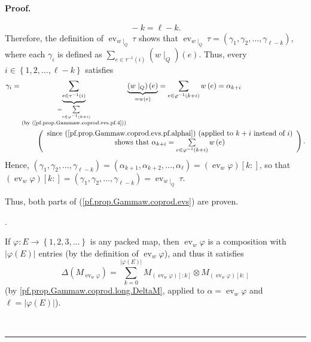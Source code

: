 \documentclass[numbers=enddot,12pt,final,onecolumn,notitlepage,abstracton]{scrartcl}
\theoremstyle{definition}
\newenvironment{proof}[1][Proof]{\noindent\textbf{#1.} }{\ \rule{0.5em}{0.5em}}
\let\sumnonlimits\sum
\renewcommand{\sum}{\sumnonlimits\limits}
\newenvironment{verlong}{}{}
\newcommand{\ev}{\operatorname{ev}}
\begin{document}
\begin{verlong}
\begin{proof}
{\begin{align*}
{}-k=\ell-k.
\end{align*}
Therefore, the definition of $\operatorname{ev}_{w\mid_{Q}}\tau$ shows that
$\operatorname{ev}_{w\mid_{Q}}\tau=\left(  \gamma_{1},\gamma_{2},\ldots
,\gamma_{\ell-k}\right)  $, where each $\gamma_{i}$ is defined as $\sum
_{e\in\tau^{-1}\left(  i\right)  }\left(  w\mid_{Q}\right)  \left(  e\right)
$. Thus, every $i\in\left\{  1,2,\ldots,\ell-k\right\}  $ satisfies%
\begin{align*}
\gamma_{i}  &  =\underbrace{\sum_{e\in\tau^{-1}\left(  i\right)  }%
}_{\substack{=\sum_{e\in\varphi^{-1}\left(  k+i\right)  }\\\text{(by
(\ref{pf.prop.Gammaw.coprod.evs.pf.4}))}}}\underbrace{\left(  w\mid
_{Q}\right)  \left(  e\right)  }_{=w\left(  e\right)  }=\sum_{e\in\varphi
^{-1}\left(  k+i\right)  }w\left(  e\right)  =\alpha_{k+i}\\
&  \ \ \ \ \ \ \ \ \ \ \left(
\begin{array}
[c]{c}%
\text{since (\ref{pf.prop.Gammaw.coprod.evs.pf.alphai}) (applied to }k+i\text{
instead of }i\text{)}\\
\text{shows that }\alpha_{k+i}=\sum_{e\in\varphi^{-1}\left(  k+i\right)
}w\left(  e\right)
\end{array}
\right)  .
\end{align*}
Hence, $\left(  \gamma_{1},\gamma_{2},\ldots,\gamma_{\ell-k}\right)  =\left(
\alpha_{k+1},\alpha_{k+2},\ldots,\alpha_{\ell}\right)  =\left(
\operatorname{ev}_{w}\varphi\right)  \left[  k:\right]  $, so that $\left(
\operatorname{ev}_{w}\varphi\right)  \left[  k:\right]  =\left(  \gamma
_{1},\gamma_{2},\ldots,\gamma_{\ell-k}\right)  =\operatorname{ev}_{w\mid_{Q}%
}\tau$.
\par
Thus, both parts of (\ref{pf.prop.Gammaw.coprod.evs}) are proven.}.

If $\varphi : E \to \left\{1,2,3,\ldots\right\}$ is any packed map, then
$\ev_w \varphi$ is a composition with $\left| \varphi\left(E\right) \right|$
entries (by the definition of $\ev_w \varphi$), and thus it satisfies
\begin{equation}
\Delta \left( M_{\ev_w \varphi} \right)
= \sum_{k=0}^{\left\vert \varphi\left(  E\right)  \right\vert }
  M_{\left(  \operatorname{ev}_{w}\varphi\right)  \left[  :k\right] }
  \otimes
  M_{\left(  \operatorname{ev}_{w}\varphi\right)  \left[  k:\right] }
\label{pf.prop.Gammaw.coprod.long.lhs-addend}
\end{equation}
(by \eqref{pf.prop.Gammaw.coprod.long.DeltaM}, applied to
$\alpha = \ev_w \varphi$ and $\ell = \left| \varphi\left(E\right) \right|$).


\end{proof}
\end{verlong}
\end{document}
